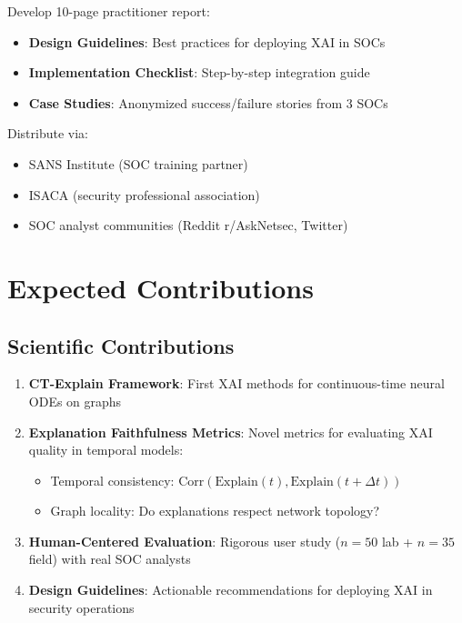 \documentclass[11pt]{article}
\begin{document}
Develop 10-page practitioner report:
\begin{itemize}
    \item \textbf{Design Guidelines}: Best practices for deploying XAI in SOCs
    \item \textbf{Implementation Checklist}: Step-by-step integration guide
    \item \textbf{Case Studies}: Anonymized success/failure stories from 3 SOCs
\end{itemize}

Distribute via:
\begin{itemize}
    \item SANS Institute (SOC training partner)
    \item ISACA (security professional association)
    \item SOC analyst communities (Reddit r/AskNetsec, Twitter)
\end{itemize}

\section{Expected Contributions}

\subsection{Scientific Contributions}

\begin{enumerate}[label=\textbf{C\arabic*.},leftmargin=*]
    \item \textbf{CT-Explain Framework}: First XAI methods for continuous-time neural ODEs on graphs

    \item \textbf{Explanation Faithfulness Metrics}: Novel metrics for evaluating XAI quality in temporal models:
    \begin{itemize}
        \item Temporal consistency: $\text{Corr}(\text{Explain}(t), \text{Explain}(t + \Delta t))$
        \item Graph locality: Do explanations respect network topology?
    \end{itemize}

    \item \textbf{Human-Centered Evaluation}: Rigorous user study ($n = 50$ lab + $n = 35$ field) with real SOC analysts

    \item \textbf{Design Guidelines}: Actionable recommendations for deploying XAI in security operations
\end{enumerate}
\end{document}
